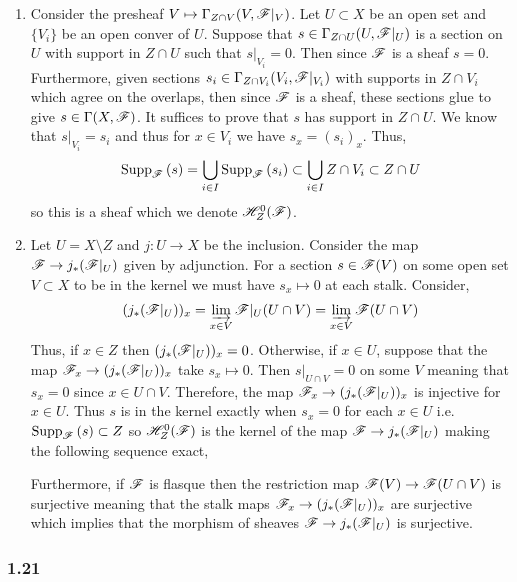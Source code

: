 \documentclass[12pt]{article}
\begin{document}
\begin{enumerate}
\item Consider the presheaf $V \mapsto \Gamma_{Z \cap V}(V, \mathscr{F}|_V)$. Let $U \subset X$ be an open set and $\{ V_i \}$ be an open conver of $U$. Suppose that $s \in \Gamma_{Z \cap U}(U, \mathscr{F}|_U)$ is a section on $U$ with support in $Z \cap U$ such that $s|_{V_i} = 0$. Then since $\mathscr{F}$ is a sheaf $s = 0$. Furthermore, given sections $s_i \in \Gamma_{Z \cap V_i}(V_i, \mathscr{F}|_{V_i})$ with supports in $Z \cap V_i$ which agree on the overlaps, then since $\mathscr{F}$ is a sheaf, these sections glue to give $s \in \Gamma(X, \mathscr{F})$. It suffices to prove that $s$ has support in $Z \cap U$. We know that $s |_{V_i} = s_i$ and thus for $x \in V_i$ we have $s_x = (s_i)_x$. Thus, 
\[ \mathrm{Supp}_{\mathscr{F}}\left(s \right) = \bigcup_{i \in I} \mathrm{Supp}_{\mathscr{F}}\left(s_i \right) \subset \bigcup_{i \in I} Z \cap V_i \subset Z \cap U \]
so this is a sheaf which we denote $\mathscr{H}^0_Z(\mathscr{F})$. 
\item Let $U = X \setminus Z$ and $j : U \to X$ be the inclusion. Consider the map $\mathscr{F} \to j_* (\mathscr{F} |_U)$ given by adjunction. For a section $s \in \mathscr{F}(V)$ on some open set $V \subset X$ to be in the kernel we must have $s_x \mapsto 0$ at each stalk. Consider,
\begin{align*}
(j_* (\mathscr{F} |_U))_x = \varinjlim_{x \in V} \mathscr{F}|_U(U \cap V) = \varinjlim_{x \in V} \mathscr{F}(U \cap V) 
\end{align*}
Thus, if $x \in Z$ then $(j_* (\mathscr{F} |_U))_x = 0$. Otherwise, if $x \in U$, suppose that the map $\mathscr{F}_x \to (j_* (\mathscr{F} |_U))_x$ take $s_x \mapsto 0$. Then $s|_{U \cap V} = 0$ on some $V$ meaning that $s_x = 0$ since $x \in U \cap V$. Therefore, the map $\mathscr{F}_x \to (j_* (\mathscr{F} |_U))_x$ is injective for $x \in U$. Thus $s$ is in the kernel exactly when $s_x = 0$ for each $x \in U$ i.e. $\mathrm{Supp}_{\mathscr{F}}\left(s \right) \subset Z$ so $\mathscr{H}^0_Z(\mathscr{F})$ is the kernel of the map $\mathscr{F} \to j_* (\mathscr{F}|_U)$ making the following sequence exact,
\begin{center}
\end{center}
Furthermore, if $\mathscr{F}$ is flasque then the restriction map $\mathscr{F}(V) \to \mathscr{F}(U \cap V)$ is surjective meaning that the stalk maps $\mathscr{F}_x \to (j_* (\mathscr{F} |_U))_x$ are surjective which implies that the morphism of sheaves $\mathscr{F} \to j_* (\mathscr{F} |_U)$ is surjective.
\end{enumerate}

\subsubsection{1.21}
\end{document}
